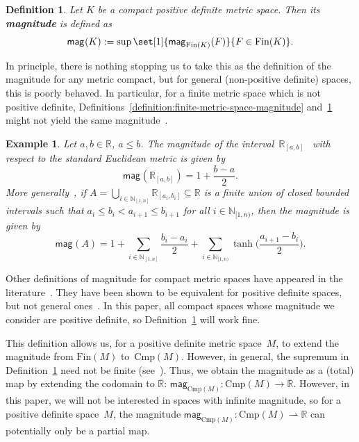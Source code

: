 \documentclass[11pt]{article}
\theoremstyle{plain}
\newtheorem{example}[theorem]{Example}
\newtheorem{definition}[theorem]{Definition}
\theoremstyle{definition}
\newcommand{\df}[1]{\emph{\textbf{#1}}}  %
\newcommand{\NN}{\mathbb{N}}
\newcommand{\RR}{\mathbb{R}}
\newcommand{\intcc}[3][\RR]{{#1}_{[#2, #3]}}
\newcommand{\intco}[3][\RR]{{#1}_{[#2, #3)}}
\newcommand{\er}{\overline{\RR}}
\newcommand{\parto}{\mathrel{\rightharpoonup}}  %
\newcommand{\mg}[1][]{\mathsf{mag}_{#1}}
\newcommand{\fsub}{\mathrm{Fin}}
\newcommand{\csub}{\mathrm{Cmp}}
\begin{document}
\begin{definition}\label{definition:compact-metric-space-magnitude}
Let $K$ be a compact positive definite metric space. Then its \df{magnitude} is defined as
\[\mg(K) := \sup\set[1]{\mg[\fsub(K) ](F)}{F \in \fsub(K)}.\]
\end{definition}

In principle, there is nothing stopping us to take this as the definition of the magnitude for any metric compact, but for general (non-positive definite) spaces, this is poorly behaved. In particular, for a finite metric space which is not positive definite, Definitions~\ref{definition:finite-metric-space-magnitude} and~\ref{definition:compact-metric-space-magnitude} might not yield the same magnitude~\cite{meckes2013}.

\begin{example}
Let $a, b \in \RR$, $a \leq b$. The magnitude of the interval~$\intcc{a}{b}$~\cite[Theorem~7]{LW13} with respect to the standard Euclidean metric is given by
\[
\mg(\intcc{a}{b}) = 1 + \frac{b - a}{2}.
\]
More generally~\cite[Corollary~5.4.3]{LM17}, if \( A = \bigcup_{i \in \intcc[\NN]{1}{n}} \intcc{a_i}{b_i} \subseteq \mathbb{R} \) is a finite union of closed bounded intervals such that $a_i \leq b_i < a_{i+1} \leq b_{i+1}$ for all $i \in \intco[\NN]{1}{n}$, then the magnitude is given by
\[
\mg(A) = 1 + \sum_{i \in \intcc[\NN]{1}{n}} \frac{b_i - a_i}{2} + \sum_{i \in \intco[\NN]{1}{n}} \tanh\big(\frac{a_{i+1} - b_i}{2}\big).
\]
\end{example}


Other definitions of magnitude for compact metric spaces have appeared in the literature~\cite{leinster2010,LW13,Willerton2014,W09,meckes2013}. They have been shown to be equivalent for positive definite spaces, but not general ones~\cite{meckes2013}. In this paper, all compact spaces whose magnitude we consider are positive definite, so Definition~\ref{definition:compact-metric-space-magnitude} will work fine.

This definition allows us, for a positive definite metric space~$M$, to extend the magnitude from $\fsub(M)$ to~$\csub(M)$. However, in general, the supremum in Definition~\ref{definition:compact-metric-space-magnitude} need not be finite (see~\cite[Theorem~2.1]{leinster2023spaces}). Thus, we obtain the magnitude as a (total) map by extending the codomain to $\er$: $\mg[\csub(M)]\colon \csub(M) \to \er$. However, in this paper, we will not be interested in spaces with infinite magnitude, so for a positive definite space~$M$, the magnitude $\mg[\csub(M)]\colon \csub(M) \parto \RR$ can potentially only be a partial map.
\end{document}
